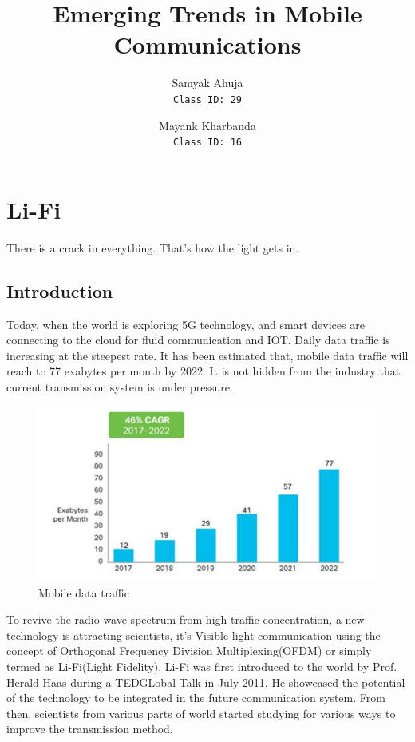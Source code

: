 \documentclass{article}
\title{Emerging Trends in Mobile Communications}
\author{
    Samyak Ahuja \\
    \texttt{Class ID: 29}
    \and
    Mayank Kharbanda \\
    \texttt{Class ID: 16}
}
\begin{document}
\maketitle

\section{Li-Fi}

\epigraph{There is a crack in everything.
That's how the light gets in.}{\textcite{selected-poem}}



\subsection{Introduction}

Today, when the world is exploring 5G technology, and smart devices are connecting to the cloud for fluid communication and IOT. 
Daily data traffic is increasing at the steepest rate. {It has been estimated that, mobile data traffic will reach to 77 exabytes per month by 2022. \cite{cisco}} 
It is not hidden from the industry that current transmission system is under pressure.\\


\begin{figure}[!h]
  \includegraphics{res/traffic_trend_li_fi.PNG}
    \caption{Mobile data traffic \cite{cisco}}
  \label{fig:traffic_trend_li_fi}
\end{figure}


To revive the radio-wave spectrum from high traffic concentration, a new technology is attracting scientists, it's Visible light communication using the concept of Orthogonal Frequency Division Multiplexing(OFDM) or simply termed as Li-Fi(Light Fidelity).\newline
Li-Fi was first introduced to the world by Prof. Herald Haas during a TEDGLobal Talk in July 2011.\cite{ted1} 
He showcased the potential of the technology to be integrated in the future communication system. 
From then, scientists from various parts of world started studying for various ways to improve the transmission method.\\
\end{document}

